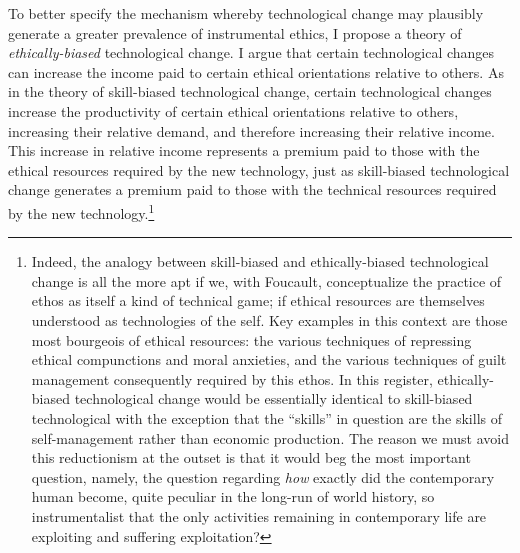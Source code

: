\documentclass[a4paper,12pt,margin=.5in]{article}
\begin{document}
To better specify the mechanism whereby technological change may
plausibly generate a greater prevalence of instrumental ethics, I
propose a theory of \emph{ethically-biased} technological change. I
argue that certain technological changes can increase the income paid to
certain ethical orientations relative to others. As in the theory of
skill-biased technological change, certain technological changes
increase the productivity of certain ethical orientations relative to
others, increasing their relative demand, and therefore increasing their
relative income. This increase in relative income represents a premium
paid to those with the ethical resources required by the new technology,
just as skill-biased technological change generates a premium paid to
those with the technical resources required by the new
technology.\footnote{Indeed, the analogy between skill-biased and
  ethically-biased technological change is all the more apt if we, with
  Foucault, conceptualize the practice of ethos as itself a kind of
  technical game; if ethical resources are themselves understood as
  technologies of the self. Key examples in this context are those most
  bourgeois of ethical resources: the various techniques of repressing
  ethical compunctions and moral anxieties, and the various techniques
  of guilt management consequently required by this ethos. In this
  register, ethically-biased technological change would be essentially
  identical to skill-biased technological with the exception that the
  ``skills'' in question are the skills of self-management rather than
  economic production. The reason we must avoid this reductionism at the
  outset is that it would beg the most important question, namely, the
  question regarding \emph{how} exactly did the contemporary human
  become, quite peculiar in the long-run of world history, so
  instrumentalist that the only activities remaining in contemporary
  life are exploiting and suffering exploitation?}
\end{document}
